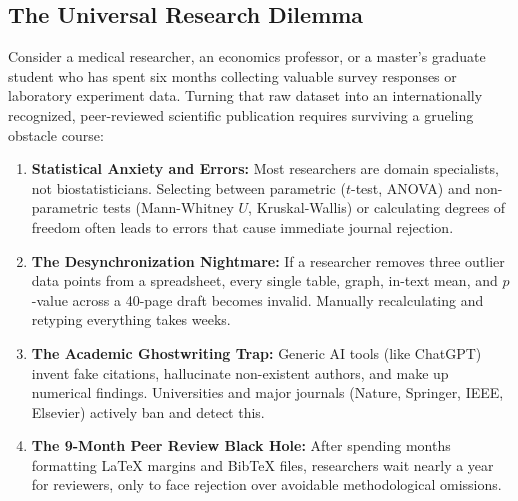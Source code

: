 \documentclass[11pt,a4paper]{article}
\begin{document}
\subsection{The Universal Research Dilemma}
Consider a medical researcher, an economics professor, or a master's graduate student who has spent six months collecting valuable survey responses or laboratory experiment data. Turning that raw dataset into an internationally recognized, peer-reviewed scientific publication requires surviving a grueling obstacle course:
\begin{enumerate}
    \item \textbf{Statistical Anxiety and Errors:} Most researchers are domain specialists, not biostatisticians. Selecting between parametric ($t$-test, ANOVA) and non-parametric tests (Mann-Whitney $U$, Kruskal-Wallis) or calculating degrees of freedom often leads to errors that cause immediate journal rejection.
    \item \textbf{The Desynchronization Nightmare:} If a researcher removes three outlier data points from a spreadsheet, every single table, graph, in-text mean, and $p$-value across a 40-page draft becomes invalid. Manually recalculating and retyping everything takes weeks.
    \item \textbf{The Academic Ghostwriting Trap:} Generic AI tools (like ChatGPT) invent fake citations, hallucinate non-existent authors, and make up numerical findings. Universities and major journals (Nature, Springer, IEEE, Elsevier) actively ban and detect this.
    \item \textbf{The 9-Month Peer Review Black Hole:} After spending months formatting LaTeX margins and BibTeX files, researchers wait nearly a year for reviewers, only to face rejection over avoidable methodological omissions.
\end{enumerate}
\end{document}
